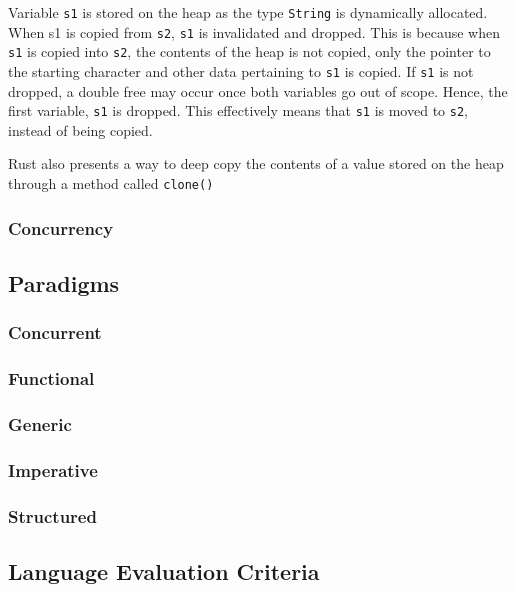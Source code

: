 \documentclass{article}
\newcommand{\rustin}[1]{\texttt{#1}}
\begin{document}
  Variable \rustin{s1} is stored on the heap as the type \rustin{String} is
  dynamically allocated. When s1 is copied from \rustin{s2}, \rustin{s1} is
  invalidated and dropped. This is because when \rustin{s1} is copied into
  \rustin{s2}, the contents of the heap is not copied, only the pointer to the
  starting character and other data pertaining to \rustin{s1} is copied. If
  \rustin{s1} is not dropped, a double free may occur once both variables go out
  of scope. Hence, the first variable, \rustin{s1} is dropped. This effectively
  means that \rustin{s1} is moved to \rustin{s2}, instead of being copied.

  Rust also presents a way to deep copy the contents of a value stored on the
  heap through a method called \rustin{clone()}

  \subsubsection{Concurrency}

  \subsection{Paradigms}

  \subsubsection{Concurrent}

  \subsubsection{Functional}

  \subsubsection{Generic}

  \subsubsection{Imperative}

  \subsubsection{Structured}

  \subsection{Language Evaluation Criteria}
\end{document}
